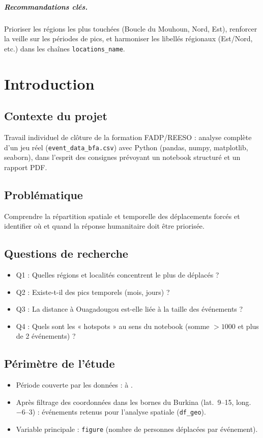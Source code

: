 \documentclass[11pt,a4paper]{report}
\begin{document}
\paragraph{Recommandations clés.}
Prioriser les régions les plus touchées (Boucle du Mouhoun, Nord, Est), renforcer la veille sur les
périodes de pics, et harmoniser les libellés régionaux (Est/Nord, etc.) dans les chaînes
\texttt{locations\_name}.

\chapter{Introduction}

\section{Contexte du projet}
Travail individuel de clôture de la formation FADP/REESO : analyse complète d'un jeu réel
(\texttt{event\_data\_bfa.csv}) avec Python (pandas, numpy, matplotlib, seaborn), dans l'esprit
des consignes prévoyant un notebook structuré et un rapport PDF.

\section{Problématique}
Comprendre la répartition spatiale et temporelle des déplacements forcés et identifier où et quand
la réponse humanitaire doit être priorisée.

\section{Questions de recherche}
\begin{itemize}
  \item Q1 : Quelles régions et localités concentrent le plus de déplacés ?
  \item Q2 : Existe-t-il des pics temporels (mois, jours) ?
  \item Q3 : La distance à Ouagadougou est-elle liée à la taille des événements ?
  \item Q4 : Quels sont les « hotspots » au sens du notebook (somme $>1000$ et plus de 2 événements) ?
\end{itemize}

\section{Périmètre de l'étude}
\begin{itemize}
  \item Période couverte par les données : \DateMin{} à \DateMax{}.
  \item Après filtrage des coordonnées dans les bornes du Burkina (lat.\ 9--15, long.\ $-6$--3) :
  \EventsGeo{} événements retenus pour l'analyse spatiale (\texttt{df\_geo}).
  \item Variable principale : \texttt{figure} (nombre de personnes déplacées par événement).
\end{itemize}
\end{document}
